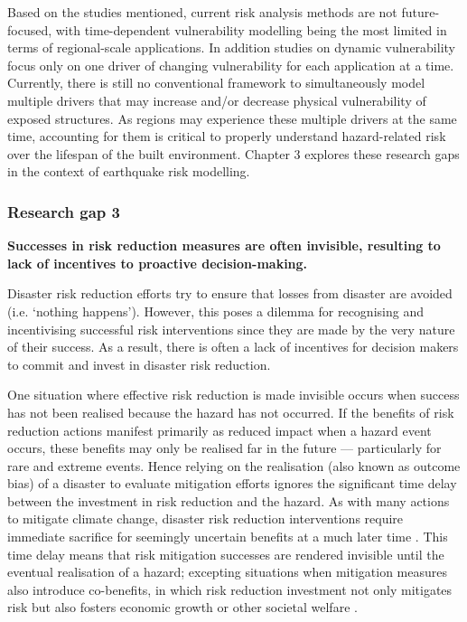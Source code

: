 Based on the studies mentioned, current risk analysis methods are not future-focused, with time-dependent vulnerability modelling being the most limited in terms of regional-scale applications. In addition studies on dynamic vulnerability focus only on one driver of changing vulnerability for each application at a time. Currently, there is still no conventional framework to simultaneously model multiple drivers that may increase and/or decrease physical vulnerability of exposed structures. As regions may experience these multiple drivers at the same time, accounting for them is critical to properly understand hazard-related risk over the lifespan of the built environment. Chapter 3 explores these research gaps in the context of earthquake risk modelling.


\subsubsection{Research gap 3}

\textbf{Successes in risk reduction measures are often invisible, resulting to lack of incentives to proactive decision-making.}

    Disaster risk reduction efforts try to ensure that losses from disaster are avoided (i.e. `nothing happens'). However, this poses a dilemma for recognising and incentivising successful risk interventions since they are made  by the very nature of their success. As a result, there is often a lack of incentives for decision makers to commit and invest in disaster risk reduction.

    One situation where effective risk reduction is made invisible occurs when success has not been realised because the hazard has not occurred. If the benefits of risk reduction actions manifest primarily as reduced impact when a hazard event occurs, these benefits may only be realised far in the future — particularly for rare and extreme events. Hence relying on the realisation (also known as outcome bias) of a disaster to evaluate mitigation efforts ignores the significant time delay between the investment in risk reduction and the hazard. As with many actions to mitigate climate change, disaster risk reduction interventions require immediate sacrifice for seemingly uncertain benefits at a much later time \citep{weber_experience-based_2006}. This time delay means that risk mitigation successes are rendered invisible until the eventual realisation of a hazard; excepting situations when mitigation measures also introduce co-benefits, in which risk reduction investment not only mitigates risk but also fosters economic growth or other societal welfare \citep{Tanner2015}.

